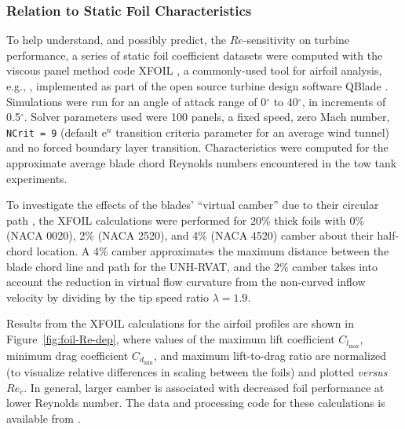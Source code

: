 \documentclass[energies,article,accept,moreauthors,pdftex,10pt,a4paper]{mdpi}
\theoremstyle{mdpi}
\newcounter{ex}
\newcounter{re}
\begin{document}
\subsubsection{Relation to Static Foil Characteristics}


To help understand, and possibly predict, the $Re$-sensitivity on turbine
performance, a series of static foil coefficient datasets were computed with the
viscous panel method code XFOIL \cite{Drela1989}, a commonly-used tool for
airfoil analysis, e.g., \cite{Castelli2011, Walker2014}, implemented as part of
the open source turbine design software QBlade \cite{Marten2013}. Simulations
were run for an angle of attack range of 0$^{\circ}$ to 40$^{\circ}$, in
increments of 0.5$^{\circ}$. Solver parameters used were 100 panels, a fixed
speed, zero Mach number, \linebreak \texttt{NCrit = 9} (default $\mathrm{e}^n$ transition
criteria parameter for an average wind tunnel) and no forced boundary layer
transition. Characteristics were computed for the approximate average blade
chord Reynolds numbers encountered in the tow tank experiments.

To investigate the effects of the blades' ``virtual camber'' due to their
circular path \cite{Migliore1980}, the XFOIL calculations were performed for
20\% thick foils with 0\% (NACA 0020), 2\% (NACA 2520), and 4\% (NACA 4520)
camber about their half-chord location. A 4\% camber approximates the maximum
distance between the blade chord line and path for the UNH-RVAT, and the 2\%
camber takes into account the reduction in virtual flow curvature from the
non-curved inflow velocity by dividing by the tip speed ratio $\lambda=1.9$.

Results from the XFOIL calculations for the airfoil profiles are shown in
Figure~\ref{fig:foil-Re-dep}, where values of the maximum lift coefficient
$C_{l_{\max}}$, minimum drag coefficient $C_{d_{\min}}$, and maximum
lift-to-drag ratio are normalized (to visualize relative differences in scaling
between the foils) and plotted \textit{versus} $Re_c$. In general, larger camber
is associated with decreased foil performance at lower Reynolds number. The data
and processing code for these calculations is available from
\cite{Bachant2015-NACAXX20-XFOIL}.
\end{document}

